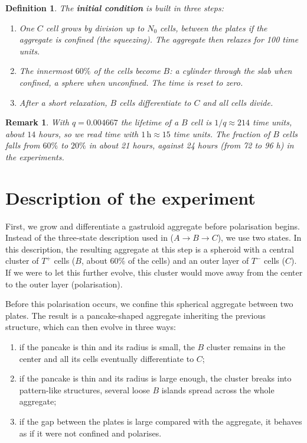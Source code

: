 \documentclass{article}
\newtheorem{definition}{Definition}
\newtheorem{remark}{Remark}
\begin{document}
\begin{definition}
    The \textbf{initial condition} is built in three steps:
    \begin{enumerate}
        \item One $C$ cell grows by division up to $N_0$ cells, between the plates if the aggregate is confined (the squeezing). The aggregate then relaxes for 100 time units.
        \item The innermost $60\%$ of the cells become $B$: a cylinder through the slab when confined, a sphere when unconfined. The time is reset to zero.
        \item After a short relaxation, $B$ cells differentiate to $C$ and all cells divide.
    \end{enumerate}
\end{definition}

\begin{remark}
    With $q = 0.004667$ the lifetime of a $B$ cell is $1/q \approx 214$ time units, about $14$ hours, so we read time with $1\,\text{h} \approx 15$ time units. The fraction of $B$ cells falls from $60\%$ to $20\%$ in about 21 hours, against 24 hours (from 72 to 96 h) in the experiments.
\end{remark}


\section{Description of the experiment}

First, we grow and differentiate a gastruloid aggregate before polarisation begins. Instead of the three-state description used in \cite{oriola} ($A\to B\to C$), we use two states. In this description, the resulting aggregate at this step is a spheroid with a central cluster of $T^+$ cells ($B$, about $60\%$ of the cells) and an outer layer of $T^-$ cells ($C$). If we were to let this further evolve, this cluster would move away from the center to the outer layer (polarisation).

Before this polarisation occurs, we confine this spherical aggregate between two plates. The result is a pancake-shaped aggregate inheriting the previous structure, which can then evolve in three ways:
\begin{enumerate}
    \item if the pancake is thin and its radius is small, the $B$ cluster remains in the center and all its cells eventually differentiate to $C$;
    \item if the pancake is thin and its radius is large enough, the cluster breaks into pattern-like structures, several loose $B$ islands spread across the whole aggregate;
    \item if the gap between the plates is large compared with the aggregate, it behaves as if it were not confined and polarises.
\end{enumerate}
\end{document}
